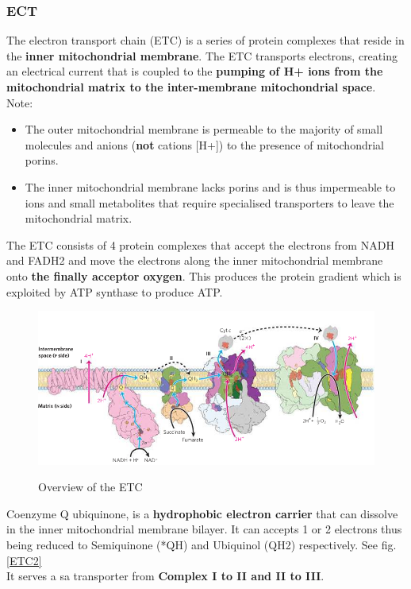 \documentclass[../main.tex]{subfiles}
\begin{document}
\subsubsection{ECT}
The electron transport chain (ETC) is a series of protein complexes that reside in the \textbf{inner mitochondrial membrane}. The ETC transports electrons, creating an electrical current that is coupled to the \textbf{pumping of H+ ions from the mitochondrial matrix to the inter-membrane mitochondrial space}. \\
Note: 
\begin{itemize}
	\item The outer mitochondrial membrane is permeable to the majority of small molecules and anions (\textbf{not} cations [H+]) to the presence of mitochondrial porins.
	\item The inner mitochondrial membrane lacks porins and is thus impermeable to ions and small metabolites that require specialised transporters to leave the mitochondrial matrix. 
\end{itemize}
\noindent 
The ETC consists of 4 protein complexes that accept the electrons from NADH and FADH2 and move the electrons along the inner mitochondrial membrane onto \textbf{the finally acceptor oxygen}. This produces the protein gradient which is exploited by ATP synthase to produce ATP.

\begin{figure}[H]
	\centering
	\includegraphics[width = 0.8 \textwidth]{ETC0}
	\label{ETC0}
	\caption{Overview of the ETC}
\end{figure}  

\begin{RemarkWithTitel}{Coenzyme Q}
	\gls{ubiquinone}, is a \textbf{hydrophobic electron carrier} that can dissolve in the inner mitochondrial membrane bilayer. It can accepts 1 or 2 electrons thus being reduced to Semiquinone (*QH) and Ubiquinol (QH2) respectively. See fig. \ref{ETC2}\\
	It serves a sa transporter from \textbf{Complex I to II and II to III}. 
\end{RemarkWithTitel}
\end{document}

